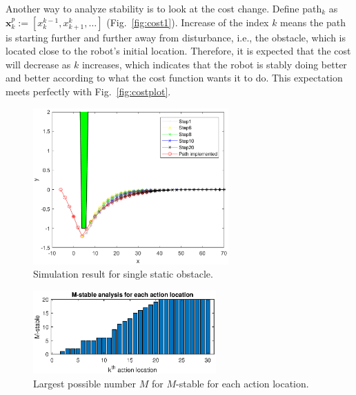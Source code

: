 \documentclass{ifacconf}
\begin{document}
 



Another way to analyze stability is to look at the cost change. Define path$_k$ as $\mathbf{x}_{k}^{p} := [x_{k}^{k-1},x_{k+1}^{k},\ldots]$ (Fig.~\ref{fig:cost1}). Increase of the index $k$ means the path is starting further and further away from disturbance, i.e., the obstacle, which is located close to the robot's initial location. Therefore, it is expected that the cost will decrease as $k$ increases, which indicates that the robot is stably doing better and better according to what the cost function wants it to do. This expectation meets perfectly with Fig.~\ref{fig:costplot}. 

\begin{figure}[t]
\begin{center}
\includegraphics[width=7.5cm]{plot/1_1.eps}
\caption{Simulation result for single static obstacle.  }
\label{fig:1_1}
\end{center}
\end{figure}


\begin{figure}[t]
\begin{center}
\includegraphics[width=7cm]{plot/1_2.eps}
\caption{Largest possible number $M$ for $M$-stable for each action location.}
\label{fig:1_3}
\end{center}
\end{figure}
\end{document}
